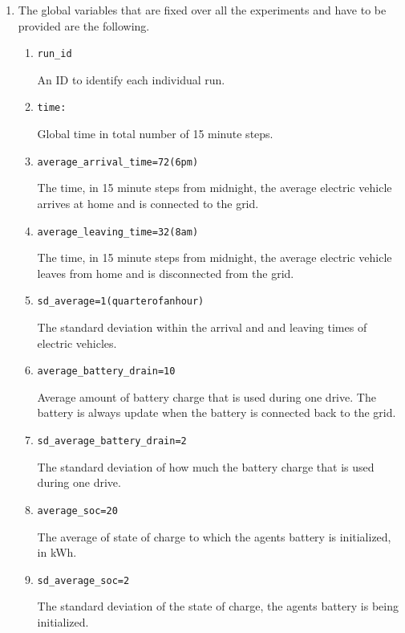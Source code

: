 \documentclass[a4paper]{article}
\begin{document}
\begin{enumerate}
 \item The global variables that are fixed over all the experiments and have to be provided are the following. 
 \begin{enumerate}
  \item \begin{alltt}run\_id\end{alltt}
  An ID to identify each individual run.
 \item \begin{alltt}time:\end{alltt} 
 Global time in total number of 15 minute steps.
 \item \begin{alltt}average_arrival_time = 72 (6pm)\end{alltt}
 The time, in 15 minute steps from midnight, the average electric vehicle arrives at home and is connected to the grid. 
 \item \begin{alltt}average_leaving_time = 32 (8am) \end{alltt}
 The time, in 15 minute steps from midnight, the average electric vehicle leaves from home and is disconnected from the grid.
 \item \begin{alltt}sd_average = 1 (quarter of an hour)\end{alltt}
 The standard deviation within the arrival and and leaving times of electric vehicles.
 \item \begin{alltt}average_battery_drain = 10 \end{alltt}
 Average amount of battery charge that is used during one drive. The battery is always update when the battery is connected back to the 
 grid. 
 \item \begin{alltt}sd_average_battery_drain = 2\end{alltt}
 The standard deviation of how much the battery charge that is used during one drive.
 \item \begin{alltt}average_soc = 20 \end{alltt}
 The average of state of charge to which the agents battery is initialized, in kWh. 
 \item \begin{alltt}sd_average_soc = 2\end{alltt}
 The standard deviation of the state of charge, the agents battery is being initialized.  

\end{enumerate}
\end{enumerate}
\end{document}
